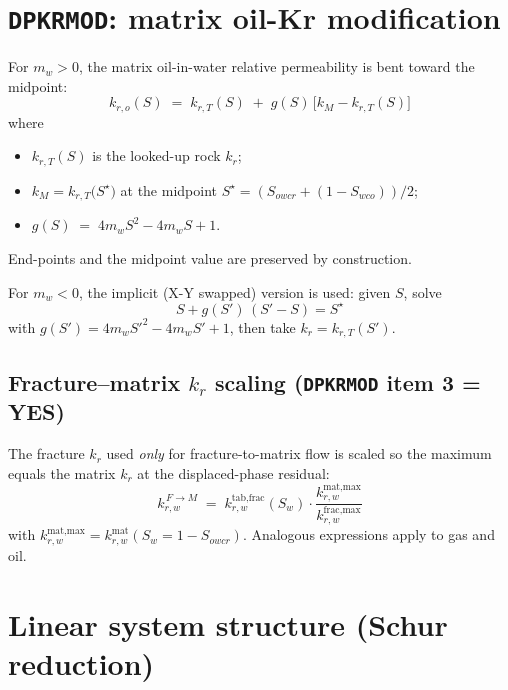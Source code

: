 \documentclass[11pt,a4paper]{article}
\newcommand{\kw}[1]{\texttt{#1}}
\begin{document}
\section{\kw{DPKRMOD}: matrix oil-Kr modification}

For $m_w > 0$, the matrix oil-in-water relative permeability is bent toward the midpoint:
\begin{equation}
k_{r,o}(S) \;=\; k_{r,T}(S) \;+\; g(S)\,\bigl[k_M - k_{r,T}(S)\bigr]
\label{eq:dpkr-pos}
\tag{TD 2.79 ; RM 3.59}
\end{equation}
where
\begin{itemize}
  \item $k_{r,T}(S)$ is the looked-up rock $k_r$;
  \item $k_M = k_{r,T}\bigl(S^\star\bigr)$ at the midpoint $S^\star = (S_{owcr} + (1 - S_{wco}))/2$;
  \item $g(S) \;=\; 4 m_w S^{2} - 4 m_w S + 1$.
\end{itemize}
End-points and the midpoint value are preserved by construction.

For $m_w < 0$, the implicit (X-Y swapped) version is used: given $S$, solve
\begin{equation}
S + g(S')\,(S' - S) = S^\star
\label{eq:dpkr-neg}
\tag{TD 2.80 ; RM 3.60}
\end{equation}
with $g(S') = 4 m_w S'^{2} - 4 m_w S' + 1$, then take $k_r = k_{r,T}(S')$.

\subsection*{Fracture--matrix $k_r$ scaling (\kw{DPKRMOD} item 3 = YES)}
The fracture $k_r$ used \emph{only} for fracture-to-matrix flow is scaled so the maximum equals the matrix $k_r$ at the displaced-phase residual:
\begin{equation}
k_{r,w}^{\,F\to M} \;=\; k_{r,w}^{\text{tab,frac}}(S_w)\cdot\frac{k_{r,w}^{\text{mat,max}}}{k_{r,w}^{\text{frac,max}}}
\label{eq:frac-kr-scale}
\tag{TD 2.81 ; RM 3.61}
\end{equation}
with $k_{r,w}^{\text{mat,max}} = k_{r,w}^{\text{mat}}(S_w = 1 - S_{owcr})$. Analogous expressions apply to gas and oil.

\section{Linear system structure (Schur reduction)}
\end{document}
